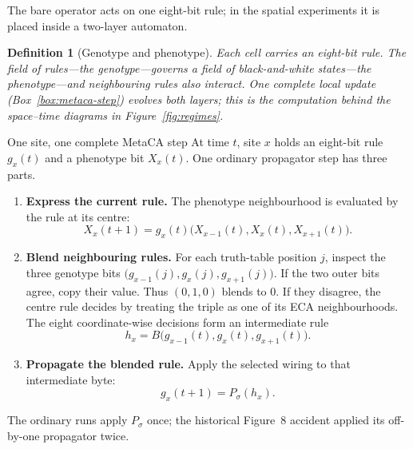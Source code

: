 \documentclass[man,12pt,floatsintext]{apa7}
\newcommand{\sig}{\sigma}
\newtheorem{definition}{Definition}
\begin{document}
The bare operator acts on one eight-bit rule; in the spatial experiments it is
placed inside a two-layer automaton.

\begin{definition}[Genotype and phenotype]\label{def:genopheno}
Each cell carries an eight-bit rule. The field of rules---the
\emph{genotype}---governs a field of black-and-white states---the
\emph{phenotype}---and neighbouring rules also interact. One complete local
update (Box~\ref{box:metaca-step}) evolves both layers; this is the computation
behind the space--time diagrams in Figure~\ref{fig:regimes}.
\end{definition}

\Needspace{0.72\textheight}
\begin{workedexample}[label={box:metaca-step}]{One site, one complete MetaCA step}
\small
At time $t$, site $x$ holds an eight-bit rule $g_x(t)$ and a phenotype bit
$X_x(t)$. One ordinary propagator step has three parts.
\begin{enumerate}
\item \textbf{Express the current rule.} The phenotype neighbourhood is
evaluated by the rule at its centre:
\[
X_x(t+1)=g_x(t)\bigl(X_{x-1}(t),X_x(t),X_{x+1}(t)\bigr).
\]
\item \textbf{Blend neighbouring rules.} For each truth-table position $j$,
inspect the three genotype bits
$\bigl(g_{x-1}(j),g_x(j),g_{x+1}(j)\bigr)$. If the two outer bits agree, copy
their value. Thus $(0,1,0)$ blends to $0$. If they disagree, the centre rule
decides by treating the triple as one of its ECA neighbourhoods. The eight
coordinate-wise decisions form an intermediate rule
\[
h_x=B\bigl(g_{x-1}(t),g_x(t),g_{x+1}(t)\bigr).
\]
\item \textbf{Propagate the blended rule.} Apply the selected wiring to that
intermediate byte:
\[
g_x(t+1)=P_\sig(h_x).
\]
\end{enumerate}
The ordinary runs apply $P_\sig$ once; the historical Figure~8 accident applied
its off-by-one propagator twice.
\end{workedexample}
\end{document}

